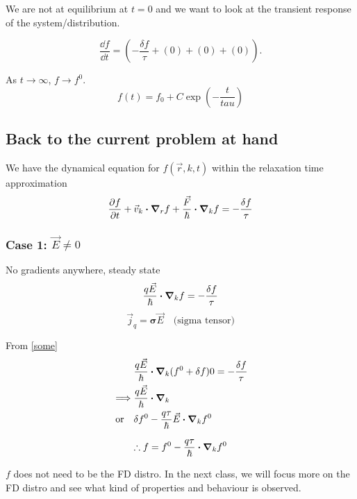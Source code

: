 \documentclass[a4paper]{article}
\begin{document}
We are not at equilibrium at $t=0$ and we want to look at the transient
response of the system/distribution.

\begin{equation}
	\frac{\dd f}{\dd t} = \left( -\frac{\delta f}{\tau} + (0) + (0) + (0) \right).
\end{equation}

As $t\to \infty$, $f\to f^{0}$.
\begin{equation}
	f(t) = f_0 + C\exp(-\frac{t}{tau})
\end{equation}

\subsection*{Back to the current problem at hand}
We have the dynamical equation for $f(\vec{r}, k, t)$ within the 
relaxation time approximation
\begin{equation}
	\pdv{f}{t} + \vec{v}_k\vdot\grad_r f + \frac{\vec{F}}{\hbar}\vdot\grad_kf = -\frac{\delta f}{\tau}
\end{equation}
\subsubsection*{Case 1: $\vec{E} \neq 0$}
No gradients anywhere, steady state
\begin{equation}
	\label{some}
	\frac{q\vec{E}}{\hbar}\vdot\grad_kf = -\frac{\delta f}{\tau}
\end{equation}
\begin{equation}
	\vec{j}_q = \mathbf{\sigma}\vec{E} \quad \text{(sigma tensor)}
\end{equation}

From \ref{some}
\begin{equation}
	\begin{split}
		&\frac{q\vec{E}}{\hbar}\vdot\grad_k(f^{0}+ \delta f)0 = -\frac{\delta f}{\tau} \\  %
		\implies & \frac{q\vec{E}}{\hbar}\vdot\grad_k \\
		\text{or} \quad & \delta f^{0} - \frac{q\tau}{\hbar}\vec{E}\vdot\grad_k f^{0}
	\end{split}
\end{equation}

\begin{equation}
	\therefore f = f^{0} - \frac{q\tau}{\hbar}\vdot\grad_kf^{0}
\end{equation}

$f$ does not need to be the FD distro. In the next class, we will focus
more on the FD distro and see what kind of properties and behaviour
is observed.
\end{document}
